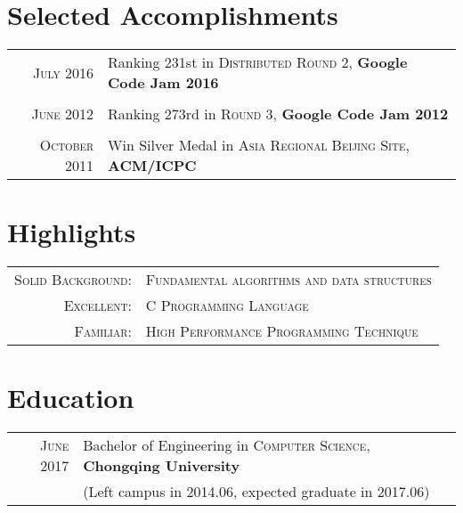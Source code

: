 \documentclass[a4paper,10pt]{article}
\begin{document}
\section{Selected Accomplishments}

\begin{tabular}{rl}
    
    \textsc{July} 2016 & Ranking 231st in \textsc{Distributed Round 2}, \textbf{Google Code Jam 2016}\\
    
    &\\
    
    \textsc{June} 2012 & Ranking 273rd in \textsc{Round 3}, \textbf{Google Code Jam 2012}\\
    
    &\\
    
    \textsc{October} 2011 & Win Silver Medal in \textsc{Asia Regional Beijing Site}, \textbf{ACM/ICPC}\\

\end{tabular}

\section{Highlights}

\begin{tabular}{rl}

    \textsc{Solid Background}: & \textsc{Fundamental algorithms and data structures}\\
    \textsc{Excellent}: & \textsc{C Programming Language}\\
    \textsc{Familiar}: & \textsc{High Performance Programming Technique}\\

\end{tabular}

\section{Education}

\begin{tabular}{rl}

    \textsc{June} 2017 & Bachelor of Engineering in \textsc{Computer Science}, \textbf{Chongqing University}\\
    &\footnotesize{(Left campus in 2014.06, expected graduate in 2017.06)}\\

\end{tabular}
\end{document}
